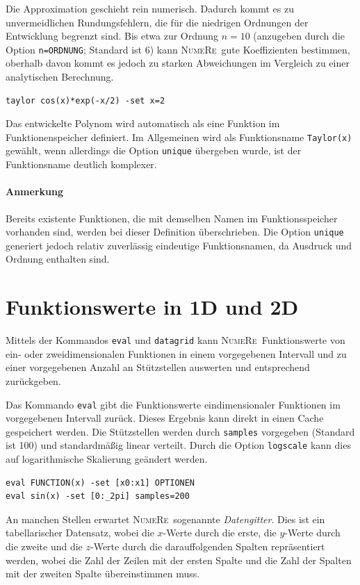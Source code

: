 \documentclass[DIV=14,headsepline,footsepline]{scrbook}
\newcommand{\NR}{\textsc{Nu\-me\-Re}}
\begin{document}
				Die Approximation geschieht rein numerisch. Dadurch kommt es zu unvermeidlichen Rundungsfehlern, die für die niedrigen Ordnungen der Entwicklung begrenzt sind. Bis etwa zur Ordnung $n = 10$ (anzugeben durch die Option \verb+n=ORDNUNG+; Standard ist 6) kann \NR\ gute Koeffizienten bestimmen, oberhalb davon kommt es jedoch zu starken Abweichungen im Vergleich zu einer analytischen Berechnung.
				\begin{lstlisting}
taylor cos(x)*exp(-x/2) -set x=2
				\end{lstlisting}
				
				Das entwickelte Polynom wird automatisch als eine Funktion im Funktionenspeicher definiert. Im Allgemeinen wird als Funktionsname \verb+Taylor(x)+ gewählt, wenn allerdings die Option \verb+unique+ übergeben wurde, ist der Funktionsname deutlich komplexer.
				\paragraph{Anmerkung}Bereits existente Funktionen, die mit demselben Namen im Funktionsspeicher vorhanden sind, werden bei dieser Definition überschrieben. Die Option \verb+unique+ generiert jedoch relativ zuverlässig eindeutige Funktionsnamen, da Ausdruck und Ordnung enthalten sind.
				
			\section{Funktionswerte in 1D und 2D} %
				Mittels der Kommandos \verb+eval+ und \verb+datagrid+ kann \NR\ Funktionswerte von ein- oder zweidimensionalen Funktionen in einem vorgegebenen Intervall und zu einer vorgegebenen Anzahl an Stützstellen auswerten und entsprechend zurückgeben.
				
				Das Kommando \verb+eval+ gibt die Funktionswerte eindimensionaler Funktionen im vorgegebenen Intervall zurück. Dieses Ergebnis kann direkt in einen Cache gespeichert werden. Die Stützstellen werden durch \verb+samples+ vorgegeben (Standard ist 100) und standardmäßig linear verteilt. Durch die Option \verb+logscale+ kann dies auf logarithmische Skalierung geändert werden.
				\begin{lstlisting}
eval FUNCTION(x) -set [x0:x1] OPTIONEN
eval sin(x) -set [0:_2pi] samples=200
				\end{lstlisting}
				
				An manchen Stellen erwartet \NR\ sogenannte \emph{Datengitter}. Dies ist ein tabellarischer Datensatz, wobei die $x$-Werte durch die erste, die $y$-Werte durch die zweite und die $z$-Werte durch die darauffolgenden Spalten repräsentiert werden, wobei die Zahl der Zeilen mit der ersten Spalte und die Zahl der Spalten mit der zweiten Spalte übereinstimmen muss.
				
\end{document}

